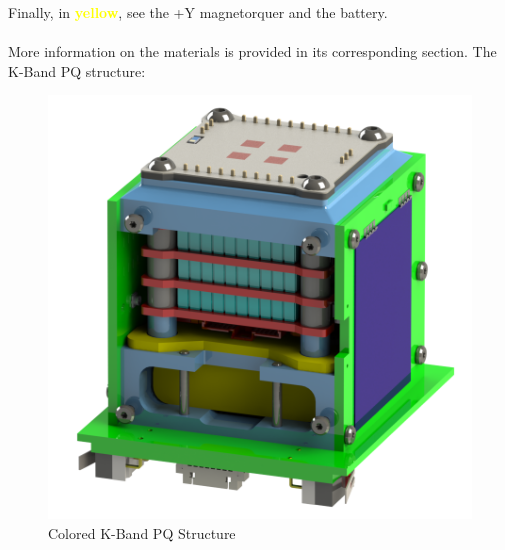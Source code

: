 Finally, in \textbf{\textcolor{yellow}{yellow}}, see the +Y magnetorquer and 
the battery.
\paragraph{}

More information on the materials is provided in its corresponding section. The K-Band
PQ structure:

\begin{figure}[H]
    \centering
    \includegraphics[width=0.3\linewidth]{res/img/1_introduction/3-KbandStrucColored.png}
    \caption{Colored K-Band PQ Structure}
    \label{fig:kbandstruc}
\end{figure}